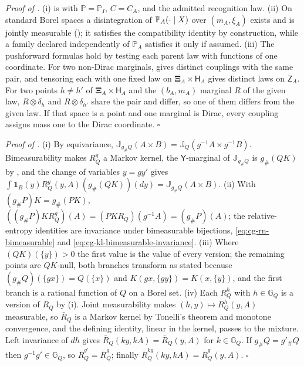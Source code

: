 \noindent\emph{Proof of .}
(i) is  with $\mathbb P=\mathbb P_I$, $C=C_A$, and the admitted
recognition law. (ii) On standard Borel spaces a disintegration of $\mathbb P_A(\cdot\mid X)$
over $(m_A,\xi_A)$ exists and is jointly measurable (); it satisfies the
compatibility identity by construction, while a family declared
independently of $\mathbb P_A$ satisfies it only if assumed. (iii) The pushforward formulas hold by
testing each parent law with functions of one coordinate. For two non-Dirac marginals,
 gives distinct couplings with the same pair, and
tensoring each with one fixed law on $\boldsymbol\Xi_A\times\mathsf H_A$ gives distinct laws on
$\mathsf Z_A$. For two points $h\neq h'$ of $\boldsymbol\Xi_A\times\mathsf H_A$ and the
$(b_A,m_A)$ marginal $R$ of the given law, $R\otimes\delta_h$ and $R\otimes\delta_{h'}$ share the
pair and differ, so one of them differs from the given law. If that space is a point and one
marginal is Dirac, every coupling assigns mass one to the Dirac coordinate. $\square$

\noindent\emph{Proof of .}
(i) By equivariance,
$\mathbb J_{g_\#Q}(A\times B)=\mathbb J_Q(g^{-1}A\times g^{-1}B)$. Bimeasurability makes $R_Q^g$ a
Markov kernel, the $\mathsf Y$-marginal of $\mathbb J_{g_\#Q}$ is $g_\#(QK)$ by
, and the change of variables $y=gy'$ gives
$\int\mathbf 1_B(y)R_Q^g(y,A)(g_\#(QK))(dy)=\mathbb J_{g_\#Q}(A\times B)$. (ii) With
$(g_\#P)K=g_\#(PK)$, $((g_\#P)KR_Q^g)(A)=(PKR_Q)(g^{-1}A)=(g_\#P)(A)$; the relative-entropy
identities are invariance under bimeasurable bijections, \eqref{eq:cg-rn-bimeasurable} and
\eqref{eq:cg-kl-bimeasurable-invariance}. (iii) Where $(QK)(\{y\})>0$ the first value is the value
of every version; the remaining points are $QK$-null, both branches transform as stated because
$(g_\#Q)(\{gx\})=Q(\{x\})$ and $K(gx,\{gy\})=K(x,\{y\})$, and the first branch is a rational
function of $Q$ on a Borel set. (iv) Each $R_Q^h$ with $h\in\mathbb G_Q$ is a version of $R_Q$ by
(i). Joint measurability makes $(h,y)\mapsto R_Q^h(y,A)$ measurable, so $\bar R_Q$ is a Markov
kernel by Tonelli's theorem and monotone convergence, and the defining identity, linear in the
kernel, passes to the mixture. Left invariance of $dh$ gives $\bar R_Q(ky,kA)=\bar R_Q(y,A)$ for
$k\in\mathbb G_Q$. If $g_\#Q=g'_\#Q$ then $g^{-1}g'\in\mathbb G_Q$, so $\bar R_Q^{g'}=\bar R_Q^g$;
finally $\bar R_Q^{kg}(ky,kA)=\bar R_Q^g(y,A)$. $\square$

